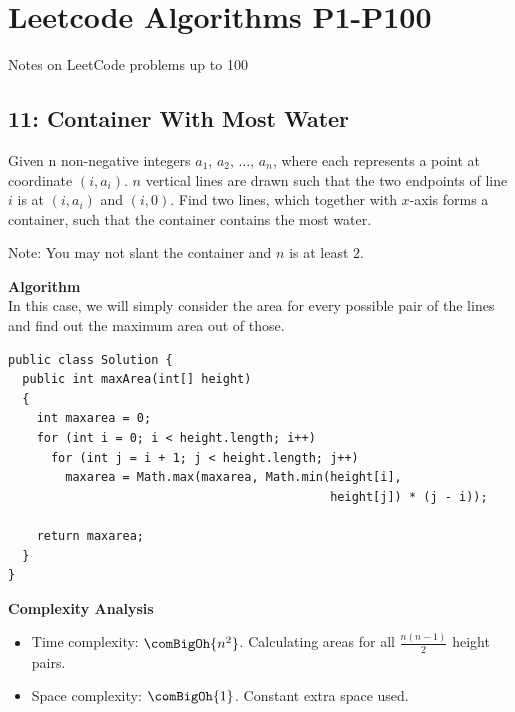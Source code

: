 \chapter[Leetcode Algorithms P1-P100]
{Leetcode Algorithms P1-P100
  \label{chP1P100}}

Notes on LeetCode problems up to 100

\section{11: Container With Most Water
  \label{secAlgoP11CntnrWthMstWtr}}

Given n non-negative integers $a_1$, $a_2$, $\ldots$, $a_n$, where each
represents a point at coordinate $(i,a_i)$. $n$ vertical lines are drawn
such that the two endpoints of line $i$ is at $(i,a_i)$ and $(i,0)$. Find
two lines, which together with $x$-axis forms a container, such that the
container contains the most water.

Note: You may not slant the container and $n$ is at least $2$.

\rrsepline{}


\noindent{}\textbf{Algorithm}\\
In this case, we will simply consider the area for every possible pair of
the lines and find out the maximum area out of those.
\begin{lstlisting}[style=raycppnewsnippet]
public class Solution {
  public int maxArea(int[] height) 
  {
    int maxarea = 0;
    for (int i = 0; i < height.length; i++)
      for (int j = i + 1; j < height.length; j++)
        maxarea = Math.max(maxarea, Math.min(height[i],
                                             height[j]) * (j - i));
    
    return maxarea;
  }
}
\end{lstlisting}

\noindent{}\textbf{Complexity Analysis}\\
\begin{itemize}[noitemsep,topsep=0pt]
\item Time complexity: $\comBigOh{n^2}$. Calculating areas for all
  $\displaystyle \frac{n(n-1)}{2}$ height pairs.
\item Space complexity: $\comBigOh{1}$. Constant extra space used.
\end{itemize}

